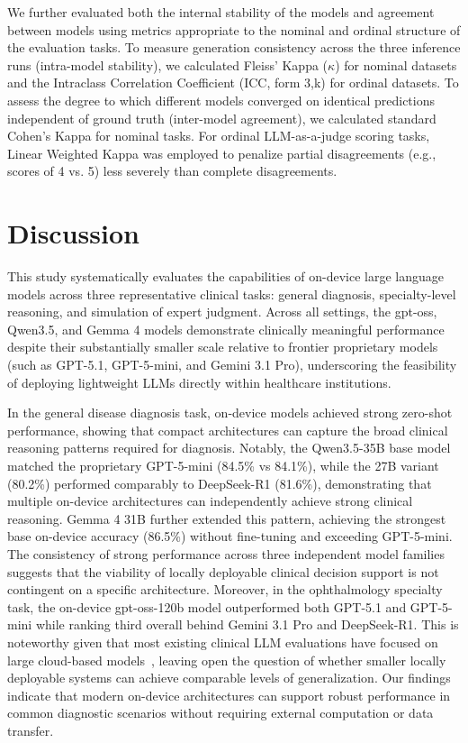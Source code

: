 \documentclass[10pt,journal,compsoc, onecolumn]{IEEEtran}
\begin{document}
We further evaluated both the internal stability of the models and agreement between models using metrics appropriate to the nominal and ordinal structure of the evaluation tasks. To measure generation consistency across the three inference runs (intra-model stability), we calculated Fleiss’ Kappa ($\kappa$) for nominal datasets and the Intraclass Correlation Coefficient (ICC, form 3,k) for ordinal datasets. To assess the degree to which different models converged on identical predictions independent of ground truth (inter-model agreement), we calculated standard Cohen’s Kappa for nominal tasks. For ordinal LLM-as-a-judge scoring tasks, Linear Weighted Kappa was employed to penalize partial disagreements (e.g., scores of 4 vs. 5) less severely than complete disagreements.


\section*{Discussion}

This study systematically evaluates the capabilities of on-device large language models across three representative clinical tasks: general diagnosis, specialty-level reasoning, and simulation of expert judgment. Across all settings, the gpt-oss, Qwen3.5, and Gemma 4 models demonstrate clinically meaningful performance despite their substantially smaller scale relative to frontier proprietary models (such as GPT-5.1, GPT-5-mini, and Gemini 3.1 Pro), underscoring the feasibility of deploying lightweight LLMs directly within healthcare institutions.

In the general disease diagnosis task, on-device models achieved strong zero-shot performance, showing that compact architectures can capture the broad clinical reasoning patterns required for diagnosis. Notably, the Qwen3.5-35B base model matched the proprietary GPT-5-mini (84.5\% vs 84.1\%), while the 27B variant (80.2\%) performed comparably to DeepSeek-R1 (81.6\%), demonstrating that multiple on-device architectures can independently achieve strong clinical reasoning. Gemma 4 31B further extended this pattern, achieving the strongest base on-device accuracy (86.5\%) without fine-tuning and exceeding GPT-5-mini. The consistency of strong performance across three independent model families suggests that the viability of locally deployable clinical decision support is not contingent on a specific architecture. Moreover, in the ophthalmology specialty task, the on-device gpt-oss-120b model outperformed both GPT-5.1 and GPT-5-mini while ranking third overall behind Gemini 3.1 Pro and DeepSeek-R1. This is noteworthy given that most existing clinical LLM evaluations have focused on large cloud-based models~\cite{zhang2025ophthreview, bhayana2024radiology, schramm2025multimodal}, leaving open the question of whether smaller locally deployable systems can achieve comparable levels of generalization. Our findings indicate that modern on-device architectures can support robust performance in common diagnostic scenarios without requiring external computation or data transfer.
\end{document}

